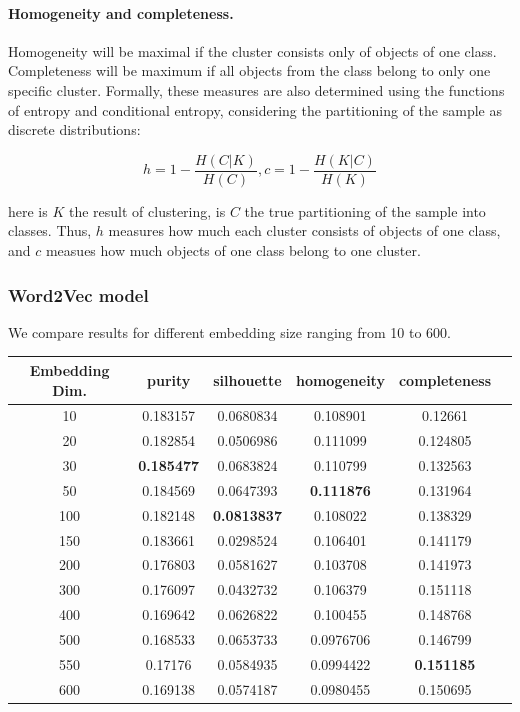 \documentclass[11pt]{article}
\begin{document}
\paragraph{Homogeneity and completeness.} Homogeneity will be maximal if the cluster consists only of objects of one class. Completeness will be maximum if all objects from the class belong to only one specific cluster.
Formally, these measures are also determined using the functions of entropy and conditional entropy, considering the partitioning of the sample as discrete distributions:

\begin{equation}
h = 1 - \frac{H(C|K)}{H(C)}, c = 1 - \frac{H(K|C)}{H(K)}
\end{equation}

here is $K$ the result of clustering, is $C$ the true partitioning of the sample into classes. Thus, $h$ measures how much each cluster consists of objects of one class, and $c$ measues how much objects of one class belong to one cluster.
\subsubsection{Word2Vec model}

We compare results for different embedding size ranging from 10 to 600.

\begin{center}
\begin{tabular}{ |c|c|c|c|c|c| }
\hline
Embedding Dim.  & purity  & silhouette  & homogeneity  & completeness\\ \hline 
10  & 0.183157  & 0.0680834  & 0.108901  & 0.12661\\ \hline 
20  & 0.182854  & 0.0506986  & 0.111099  & 0.124805\\ \hline 
30  & \textbf{0.185477}  & 0.0683824  & 0.110799  & 0.132563\\ \hline 
50  & 0.184569  & 0.0647393  & \textbf{0.111876}  & 0.131964\\ \hline 
100  & 0.182148  & \textbf{0.0813837}  & 0.108022  & 0.138329\\ \hline 
150  & 0.183661  & 0.0298524  & 0.106401  & 0.141179\\ \hline 
200  & 0.176803  & 0.0581627  & 0.103708  & 0.141973\\ \hline 
300  & 0.176097  & 0.0432732  & 0.106379  & 0.151118\\ \hline 
400  & 0.169642  & 0.0626822  & 0.100455  & 0.148768\\ \hline 
500  & 0.168533  & 0.0653733  & 0.0976706  & 0.146799\\ \hline 
550  & 0.17176  & 0.0584935  & 0.0994422  & \textbf{0.151185}\\ \hline 
600  & 0.169138  & 0.0574187  & 0.0980455  & 0.150695\\ \hline \end{tabular}
\end{center}
\FloatBarrier
\end{document}
